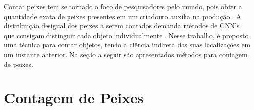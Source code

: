 
Contar peixes tem se tornado o foco de pesquisadores pelo mundo, pois obter a quantidade exata de peixes presentes em um criadouro auxilia na produção \cite{FAO}. A distribuição desigual dos peixes a serem contados demanda métodos de CNN's que consigam distinguir cada objeto individualmente \cite{article, Simonyan14c, inproceedings, 8451787}.
Nesse trabalho, é proposto uma técnica para contar objetos, tendo a ciência indireta das suas localizações em um instante anterior.
Na seção a seguir são apresentados métodos para contagem de peixes.

\section{Contagem de Peixes}









